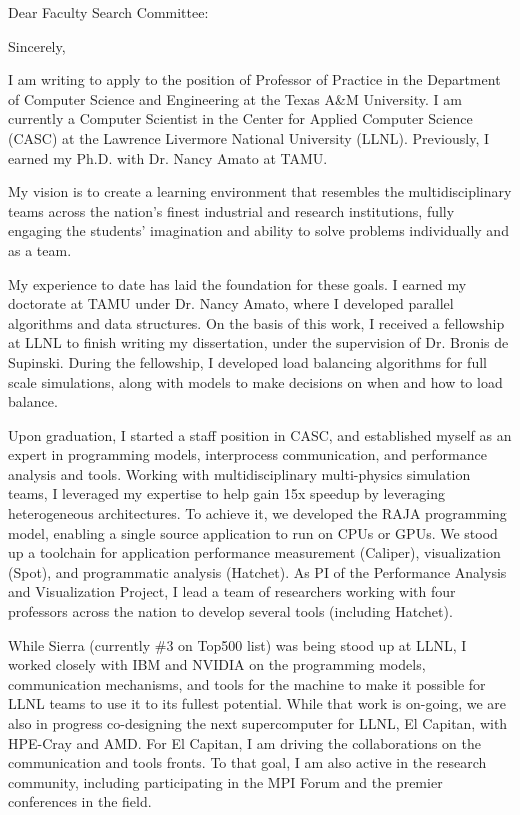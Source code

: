 \documentclass[10pt,letterpaper]{moderncv/moderncv}
\begin{document}
\date{}
\opening{Dear Faculty Search Committee:}
\closing{Sincerely,}
\makelettertitle%



I am writing to apply to the position of Professor of Practice in the Department of Computer Science and Engineering at the Texas A\&M University.  I am currently a Computer Scientist in the Center for Applied Computer Science (CASC) at the Lawrence Livermore National University (LLNL).  Previously, I earned my Ph.D. with Dr. Nancy Amato at TAMU.

My vision is to create a learning environment that resembles the multidisciplinary teams across the nation's finest industrial and research institutions,
fully engaging the students' imagination and ability to solve problems individually and as a team.

My experience to date has laid the foundation for these goals.  I earned my doctorate at TAMU under Dr. Nancy Amato, where I developed parallel algorithms and data structures.
On the basis of this work, I received a fellowship at LLNL to finish writing my dissertation, under the supervision of Dr. Bronis de Supinski.
During the fellowship, I developed load balancing algorithms for full scale simulations, along with models to make decisions on when and how to load balance.

Upon graduation, I started a staff position in CASC, and established myself as an expert in programming models, interprocess communication, and performance analysis and tools.
Working with multidisciplinary multi-physics simulation teams, I leveraged my expertise to help gain 15x speedup by leveraging heterogeneous architectures.
To achieve it, we developed the RAJA programming model, enabling a single source application to run on CPUs or GPUs.
We stood up a toolchain for application performance measurement (Caliper), visualization (Spot), and programmatic analysis (Hatchet).
As PI of the Performance Analysis and Visualization Project, I lead a team of researchers working with four professors across the nation
to develop several tools (including Hatchet).

While Sierra (currently \#3 on Top500 list) was being stood up at LLNL, I worked closely with IBM and NVIDIA on the programming models,
communication mechanisms, and tools for the machine to make it possible for LLNL teams to use it to its fullest potential.
While that work is on-going, we are also in progress co-designing the next supercomputer for LLNL, El Capitan, with HPE-Cray and AMD.
For El Capitan, I am driving the collaborations on the communication and tools fronts.  To that goal,
I am also active in the research community, including participating in the MPI Forum and the premier conferences in the field.
\end{document}
